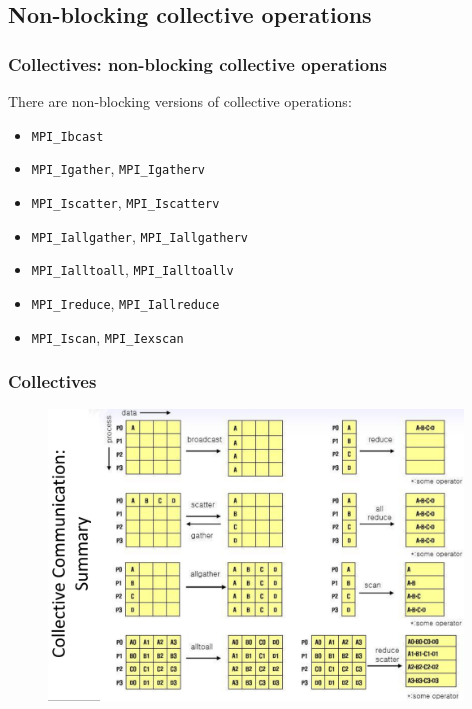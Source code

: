\documentclass{beamer}
\begin{document}
\subsection{Non-blocking collective operations}
\begin{frame}[fragile]
  \frametitle{Collectives: non-blocking collective operations}

There are non-blocking versions of collective operations: 
\begin{itemize}
\item {\color{mycolorcode}\verb|MPI_Ibcast|}
\item {\color{mycolorcode}\verb|MPI_Igather|}, {\color{mycolorcode}\verb|MPI_Igatherv|}
\item {\color{mycolorcode}\verb|MPI_Iscatter|}, {\color{mycolorcode}\verb|MPI_Iscatterv|}
\item {\color{mycolorcode}\verb|MPI_Iallgather|}, {\color{mycolorcode}\verb|MPI_Iallgatherv|}
\item {\color{mycolorcode}\verb|MPI_Ialltoall|}, {\color{mycolorcode}\verb|MPI_Ialltoallv|}
\item {\color{mycolorcode}\verb|MPI_Ireduce|}, {\color{mycolorcode}\verb|MPI_Iallreduce|}
\item {\color{mycolorcode}\verb|MPI_Iscan|}, {\color{mycolorcode}\verb|MPI_Iexscan|}
\end{itemize}
\end{frame}


\begin{frame}[fragile]
  \frametitle{Collectives}
 \begin{figure}[h]
\includegraphics[width=11.0cm]{graphs/collectives1.png}
 \end{figure}

\end{frame}
\end{document}
